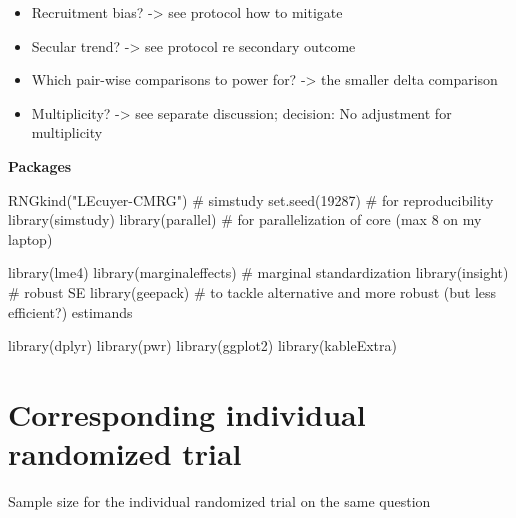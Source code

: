\documentclass[
  letterpaper,
  DIV=11,
  numbers=noendperiod]{scrartcl}
\newenvironment{Shaded}{\begin{snugshade}}{\end{snugshade}}
\newcommand{\CommentTok}[1]{\textcolor[rgb]{0.37,0.37,0.37}{#1}}
\newcommand{\DecValTok}[1]{\textcolor[rgb]{0.68,0.00,0.00}{#1}}
\newcommand{\FunctionTok}[1]{\textcolor[rgb]{0.28,0.35,0.67}{#1}}
\newcommand{\NormalTok}[1]{\textcolor[rgb]{0.00,0.23,0.31}{#1}}
\newcommand{\StringTok}[1]{\textcolor[rgb]{0.13,0.47,0.30}{#1}}
\begin{document}
\begin{itemize}
\item
  Recruitment bias? -\textgreater{} see protocol how to mitigate
\item
  Secular trend? -\textgreater{} see protocol re secondary outcome
\item
  Which pair-wise comparisons to power for? -\textgreater{} the smaller
  delta comparison
\item
  Multiplicity? -\textgreater{} see separate discussion; decision: No
  adjustment for multiplicity
\end{itemize}

\textbf{Packages}

\begin{Shaded}
\begin{Highlighting}[]
\FunctionTok{RNGkind}\NormalTok{(}\StringTok{"L\textquotesingle{}Ecuyer{-}CMRG"}\NormalTok{) }\CommentTok{\# simstudy}
\FunctionTok{set.seed}\NormalTok{(}\DecValTok{19287}\NormalTok{) }\CommentTok{\# for reproducibility}
\FunctionTok{library}\NormalTok{(simstudy)}
\FunctionTok{library}\NormalTok{(parallel) }\CommentTok{\# for parallelization of core (max 8 on my laptop)}

\FunctionTok{library}\NormalTok{(lme4)}
\FunctionTok{library}\NormalTok{(marginaleffects) }\CommentTok{\# marginal standardization}
\FunctionTok{library}\NormalTok{(insight) }\CommentTok{\# robust SE}
\FunctionTok{library}\NormalTok{(geepack) }\CommentTok{\# to tackle alternative and more robust (but less efficient?) estimands}

\FunctionTok{library}\NormalTok{(dplyr)}
\FunctionTok{library}\NormalTok{(pwr)}
\FunctionTok{library}\NormalTok{(ggplot2)}
\FunctionTok{library}\NormalTok{(kableExtra)}
\end{Highlighting}
\end{Shaded}

\section{Corresponding individual randomized
trial}\label{corresponding-individual-randomized-trial}

Sample size for the individual randomized trial on the same question
\end{document}
